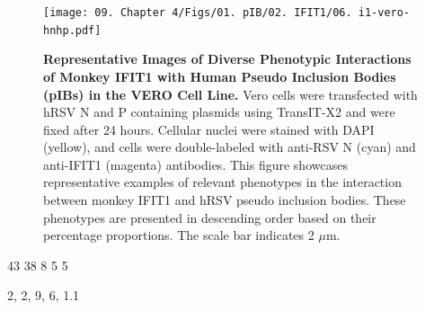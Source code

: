 \begin{figure}
    \centering
    \texttt{[image: 09. Chapter 4/Figs/01. pIB/02. IFIT1/06. i1-vero-hnhp.pdf]}
    \caption[Representative Images of Diverse Phenotypic Interactions of Monkey IFIT1 with Human Pseudo Inclusion Bodies (pIBs) in the VERO Cell Line.]{\textbf{Representative Images of Diverse Phenotypic Interactions of Monkey IFIT1 with Human Pseudo Inclusion Bodies (pIBs) in the VERO Cell Line.} Vero cells were transfected with hRSV N and P containing plasmids using TransIT-X2 and were fixed after 24 hours. Cellular nuclei were stained with DAPI (yellow), and cells were double-labeled with anti-RSV N (cyan) and anti-IFIT1 (magenta) antibodies. This figure showcases representative examples of relevant phenotypes in the interaction between monkey IFIT1 and hRSV pseudo inclusion bodies. These phenotypes are presented in descending order based on their percentage proportions. The scale bar indicates 2 \(\mu \mbox{m}\).}
    \label{fig:Representative Images of Diverse Phenotypic Interactions of Monkey IFIT1 with Human Pseudo Inclusion Bodies (pIBs) in the VERO Cell Line}
\end{figure}

43 38 8 5 5

2, 2, 9, 6, 1.1


